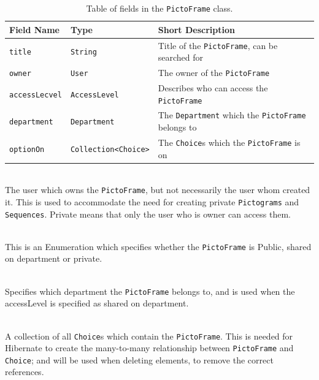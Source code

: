 \begin{table}[!h]
    \footnotesize
    \centering
    \begin{tabularx}{\textwidth}{ l l X }
        Field Name    & Type                                & Short Description                                \\
        \midrule
        \texttt{title}        & \texttt{String}       & Title of the \texttt{PictoFrame}, can be searched for\\
        \texttt{owner}        & \texttt{User}         & The owner of the \texttt{PictoFrame}  \\
        \texttt{accessLecvel} & \texttt{AccessLevel}  & Describes who can access the \texttt{PictoFrame} \\
        \texttt{department}   & \texttt{Department}  & The \texttt{Department} which the \texttt{PictoFrame} belongs to\\
        \texttt{optionOn} & \texttt{Collection\textless Choice\textgreater}  & The \texttt{Choice}s which the \texttt{PictoFrame} is on\\
    \end{tabularx}
    \caption{Table of fields in the \texttt{PictoFrame} class.}
    \label{tbl:pictoframe_class}
\end{table}

    \begin{description}[font=\ttfamily\bfseries]
        \item[owner] \hfill \\ The user which owns the \texttt{PictoFrame}, but not necessarily the user whom created it.
        This is used to accommodate the need for creating private \texttt{Pictograms} and \texttt{Sequences}.
        Private means that only the user who is owner can access them.
        \item[accessLevel] \hfill \\ This is an Enumeration which specifies whether the \texttt{PictoFrame} is Public, shared on department or private.
        \item[department] \hfill \\ Specifies which department the \texttt{PictoFrame} belongs to, and is used when the accessLevel is specified as shared on department.
        \item[optionOn] \hfill \\ A collection of all \texttt{Choice}s which contain the \texttt{PictoFrame}.
        This is needed for Hibernate to create the many-to-many relationship between \texttt{PictoFrame} and \texttt{Choice}; and will be used when deleting elements, to remove the correct references.
    \end{description}

